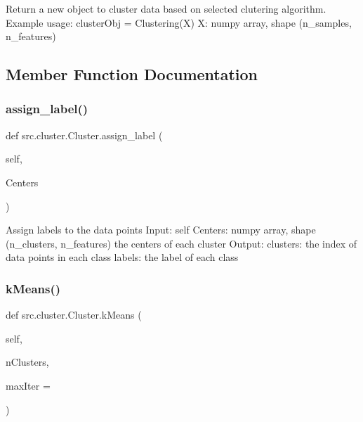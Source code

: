 \begin{DoxyVerb}Return a new object to cluster data based on selected clutering
algorithm.
Example usage: clusterObj = Clustering(X)
X:     numpy array, shape (n_samples, n_features)\end{DoxyVerb}
 

\subsection{Member Function Documentation}
\mbox{\label{classsrc_1_1cluster_1_1Cluster_a8cb50b6db992f7a5c686c0d00fb2343a}} 
\subsubsection{\texorpdfstring{assign\+\_\+label()}{assign\_label()}}
{\footnotesize\ttfamily def src.\+cluster.\+Cluster.\+assign\+\_\+label (\begin{DoxyParamCaption}\item[{}]{self,  }\item[{}]{Centers }\end{DoxyParamCaption})}

\begin{DoxyVerb}Assign labels to the data points
    Input:
self
Centers:  numpy array, shape (n_clusters, n_features) the centers of each cluster
    Output:
clusters: the index of data points in each class
labels: the label of each class\end{DoxyVerb}
 \mbox{\label{classsrc_1_1cluster_1_1Cluster_afd29b7a67da864dbc7b8352e8ed0cdab}} 
\subsubsection{\texorpdfstring{k\+Means()}{kMeans()}}
{\footnotesize\ttfamily def src.\+cluster.\+Cluster.\+k\+Means (\begin{DoxyParamCaption}\item[{}]{self,  }\item[{}]{n\+Clusters,  }\item[{}]{max\+Iter = {} }\end{DoxyParamCaption})}


